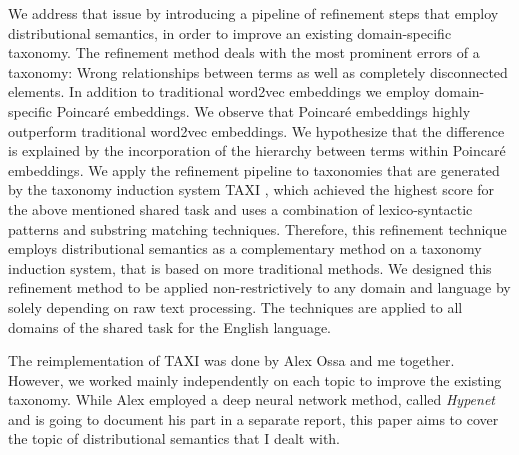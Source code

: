 \documentclass[12pt, headsepline, a4paper]{scrartcl}
\begin{document}
We address that issue by introducing a pipeline of refinement steps that employ distributional semantics, in order to improve an existing domain-specific taxonomy. The refinement method deals with the most prominent errors of a taxonomy: Wrong relationships between terms as well as completely disconnected elements. In addition to traditional word2vec embeddings we employ domain-specific Poincaré embeddings. We observe that Poincaré embeddings highly outperform traditional word2vec embeddings. We hypothesize that the difference is explained by the incorporation of the hierarchy between terms within Poincaré embeddings. We apply the refinement pipeline to taxonomies that are generated by the taxonomy induction system TAXI \citep{panchenko2016taxi}, which achieved the highest score for the above mentioned shared task and uses a combination of lexico-syntactic patterns and substring matching techniques. Therefore, this refinement technique employs distributional semantics as a complementary method on a taxonomy induction system, that is based on more traditional methods. We designed this refinement method to be applied non-restrictively to any domain and language by solely depending on raw text processing. The techniques are applied to all domains of the shared task for the English language. 


The reimplementation of TAXI was done by Alex Ossa and me together. However, we worked mainly independently on each topic to improve the existing taxonomy. While Alex employed a deep neural network method, called \emph{Hypenet} \citep{shwartz2016improving} and is going to document his part in a separate report, this paper aims to cover the topic of distributional semantics that I dealt with.
\end{document}
